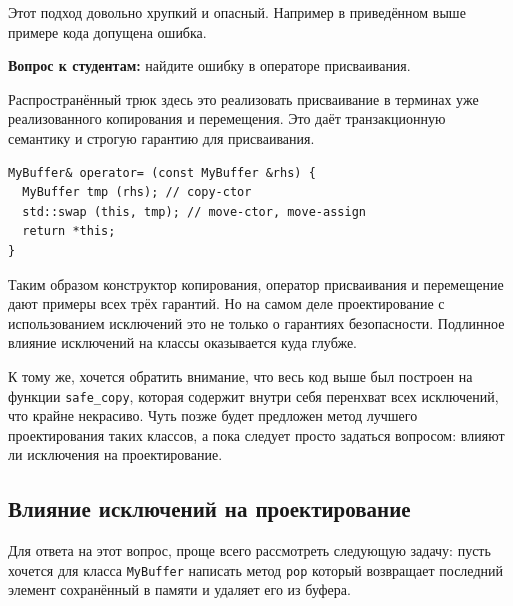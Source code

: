 \documentclass[a4paper,12pt,oneside]{book}
\newif\ifanswers
\begin{document}
Этот подход довольно хрупкий и опасный. Например в приведённом выше примере кода допущена ошибка.

\textbf{Вопрос к студентам:} найдите ошибку в операторе присваивания.

\ifanswers
Правильный ответ: из \lstinline!safe_copy! может прилететь исключение, а содержимое уже стёрто. В этот момент объект приходит в неконсистентное состояние.

Можно даже показать как исправить эту проблему.

\begin{lstlisting}
MyBuffer& operator= (const MyBuffer &rhs) {
  if (this == &rhs) return *this;
  T *narr = safe_copy(rhs.arr_, rhs.size_);
  delete [] arr_;
  arr_ = narr;
  size_ = rhs.size_; used_ = rhs.used_;
  return *this;
}
\end{lstlisting}

Но ниже всё равно будет приведён более радикальный способ исправления.
\fi

Распространённый трюк здесь это реализовать присваивание в терминах уже реализованного копирования и перемещения. Это даёт транзакционную семантику и строгую гарантию для присваивания.

\begin{lstlisting}
MyBuffer& operator= (const MyBuffer &rhs) {
  MyBuffer tmp (rhs); // copy-ctor
  std::swap (this, tmp); // move-ctor, move-assign
  return *this;
}
\end{lstlisting}

Таким образом конструктор копирования, оператор присваивания и перемещение дают примеры всех трёх гарантий. Но на самом деле проектирование с использованием исключений это не только о гарантиях безопасности. Подлинное влияние исключений на классы оказывается куда глубже.

К тому же, хочется обратить внимание, что весь код выше был построен на функции \lstinline!safe_copy!, которая содержит внутри себя перенхват всех исключений, что крайне некрасиво. Чуть позже будет предложен метод лучшего проектирования таких классов, а пока следует просто задаться вопросом: влияют ли исключения на проектирование.

\subsection{Влияние исключений на проектирование}\label{subsub:excimportance}

Для ответа на этот вопрос, проще всего рассмотреть следующую задачу: пусть хочется для класса \lstinline!MyBuffer! написать метод \lstinline!pop! который возвращает последний элемент сохранённый в памяти и удаляет его из буфера.
\end{document}
